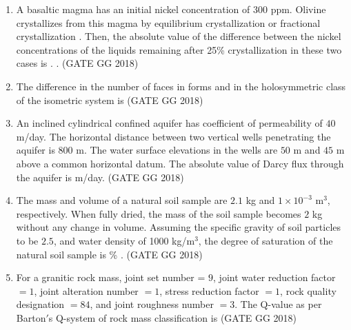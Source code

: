 \documentclass[journal]{IEEEtran}
\begin{document}
\begin{enumerate}[start=1]
\item A basaltic magma has an initial nickel concentration of 300 ppm. Olivine crystallizes from this magma by equilibrium crystallization or fractional crystallization . Then, the absolute value of the difference between the nickel concentrations of the liquids remaining after 25\% crystallization in these two cases is \makebox[2cm]{\hrulefill}.  
.
\hspace*{15.7cm}(GATE GG 2018)
\vspace{0.5cm}

\item The difference in the number of faces in forms  and  in the holosymmetric class of the isometric system is \makebox[2cm]{\hrulefill}
\hspace*{15.7cm}(GATE GG 2018)
\vspace{0.5cm}
\item An inclined cylindrical confined aquifer has coefficient of permeability of $40$ m/day.  The horizontal distance between two vertical wells penetrating the aquifer is $800$ m.  The water surface elevations in the wells are $50$ m and $45$ m above a common horizontal datum.  The absolute value of Darcy flux through the aquifer is \makebox[2cm]{\hrulefill} m/day.
\hfill(GATE GG 2018)
\vspace{0.5cm}

\item The mass and volume of a natural soil sample are $2.1$ kg and $1\times 10^{-3}$ m$^3$, respectively.  When fully dried, the mass of the soil sample becomes $2$ kg without any change in volume.  Assuming the specific gravity of soil particles to be $2.5$, and water density of 1000 kg/m$^3$,  the degree of saturation of the natural soil sample is \makebox[2cm]{\hrulefill}\% .
\hfill(GATE GG 2018)
\vspace{0.5cm}

\item For a granitic rock mass, joint set number  = $9$, joint water reduction factor $= 1$,  joint alteration number  $= 1$, stress reduction factor  $= 1$, rock quality designation \brak{\%} $= 84$,  and joint roughness number  $= 3$.  The Q-value as per Barton$'$s Q-system of rock mass classification  is 
\hfill(GATE GG 2018)
\vspace{0.5cm}


\end{enumerate}
\end{document}
